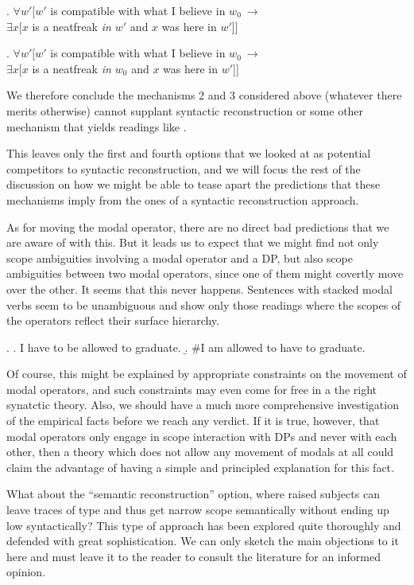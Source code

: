 \ex. $\forall w'[w'$ is compatible with what I believe in $w_{0}\ \rightarrow$ \\
\null\hfill$\exists x[x$ is a neatfreak \emph{in $w'$} and $x$ was here in $w'$]]

\ex. $\forall w'[w'$ is compatible with what I believe in $w_{0}\ \rightarrow$ \\
\null\hfill$\exists x[x$ is a neatfreak \emph{in $w_{0}$} and $x$ was here in $w'$]]

We therefore conclude the mechanisms 2 and 3 considered above (whatever there merits otherwise) cannot supplant syntactic reconstruction or some other mechanism that yields readings like \LLast.

This leaves only the first and fourth options that we looked at as potential competitors to syntactic reconstruction, and we will focus the rest of the discussion on how we might be able to tease apart the predictions that these mechanisms imply from the ones of a syntactic reconstruction approach.

As for moving the modal operator, there are no direct bad predictions that we are aware of with this. But it leads us to expect that we might find not only scope ambiguities involving a modal operator and a DP, but also scope ambiguities between two modal operators, since one of them might covertly move over the other. It seems that this never happens. Sentences with stacked modal verbs seem to be unambiguous and show only those readings where the scopes of the operators reflect their surface hierarchy.

\ex. \a. I have to be allowed to graduate. \b. \#I am allowed to have to graduate. 

Of course, this might be explained by appropriate constraints on the movement of modal operators, and such constraints may even come for free in a the right synatctic theory. Also, we should have a much more comprehensive investigation of the empirical facts before we reach any verdict. If it is true, however, that modal operators only engage in scope interaction with DPs and never with each other, then a theory which does not allow any movement of modals at all could claim the advantage of having a simple and principled explanation for this fact.

What about the ``semantic reconstruction'' option, where raised subjects can leave traces of type  and thus get narrow scope semantically without ending up low syntactically? This type of approach has been explored quite thoroughly and defended with great sophistication. We can only sketch the main objections to it here and must leave it to the reader to consult the literature for an informed opinion.

